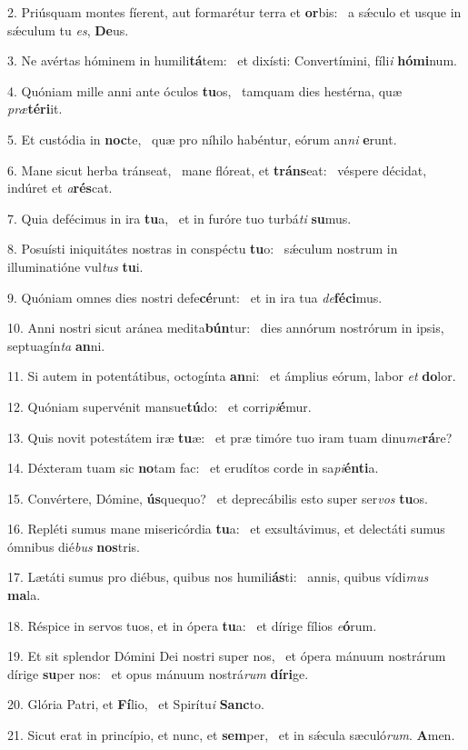 2. Priúsquam montes fíerent, aut formarétur terra et \textbf{or}bis: \ast\  a sǽculo et usque in sǽculum tu \textit{es}, \textbf{De}us.\

3. Ne avértas hóminem in humili\textbf{tá}tem: \ast\  et dixísti: Convertímini, fíli\textit{i} \textbf{hó}\textbf{mi}num.\

4. Quóniam mille anni ante óculos \textbf{tu}os, \ast\  tamquam dies hestérna, quæ \textit{præ}\textbf{tér}\textbf{i}it.\

5. Et custódia in \textbf{noc}te, \ast\  quæ pro níhilo habéntur, eórum an\textit{ni} \textbf{e}runt.\

6. Mane sicut herba tránseat, \dag\  mane flóreat, et \textbf{tráns}eat: \ast\  véspere décidat, indúret et \textit{a}\textbf{rés}cat.\

7. Quia defécimus in ira \textbf{tu}a, \ast\  et in furóre tuo turbá\textit{ti} \textbf{su}mus.\

8. Posuísti iniquitátes nostras in conspéctu \textbf{tu}o: \ast\  sǽculum nostrum in illuminatióne vul\textit{tus} \textbf{tu}i.\

9. Quóniam omnes dies nostri defe\textbf{cé}runt: \ast\  et in ira tua \textit{de}\textbf{fé}\textbf{ci}mus.\

10. Anni nostri sicut aránea medita\textbf{bún}tur: \ast\  dies annórum nostrórum in ipsis, septuagín\textit{ta} \textbf{an}ni.\

11. Si autem in potentátibus, octogínta \textbf{an}ni: \ast\  et ámplius eórum, labor \textit{et} \textbf{do}lor.\

12. Quóniam supervénit mansue\textbf{tú}do: \ast\  et corri\textit{pi}\textbf{é}mur.\

13. Quis novit potestátem iræ \textbf{tu}æ: \ast\  et præ timóre tuo iram tuam dinu\textit{me}\textbf{rá}re?\

14. Déxteram tuam sic \textbf{no}tam fac: \ast\  et erudítos corde in sa\textit{pi}\textbf{én}\textbf{ti}a.\

15. Convértere, Dómine, \textbf{ús}quequo? \ast\  et deprecábilis esto super ser\textit{vos} \textbf{tu}os.\

16. Repléti sumus mane misericórdia \textbf{tu}a: \ast\  et exsultávimus, et delectáti sumus ómnibus dié\textit{bus} \textbf{nos}tris.\

17. Lætáti sumus pro diébus, quibus nos humili\textbf{ás}ti: \ast\  annis, quibus vídi\textit{mus} \textbf{ma}la.\

18. Réspice in servos tuos, et in ópera \textbf{tu}a: \ast\  et dírige fílios \textit{e}\textbf{ó}rum.\

19. Et sit splendor Dómini Dei nostri super nos, \dag\  et ópera mánuum nostrárum dírige \textbf{su}per nos: \ast\  et opus mánuum nostrá\textit{rum} \textbf{dí}\textbf{ri}ge.\

20. Glória Patri, et \textbf{Fí}lio, \ast\  et Spirítu\textit{i} \textbf{Sanc}to.\

21. Sicut erat in princípio, et nunc, et \textbf{sem}per, \ast\  et in sǽcula sæculó\textit{rum}. \textbf{A}men.\

